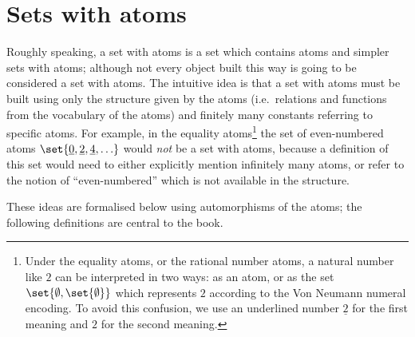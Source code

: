 


\section{Sets with atoms} 
\label{sec:definition-of-sets-with-atoms} Roughly speaking, a set with atoms is a set which contains atoms and simpler sets with atoms; although not every object built this way is going to be considered a set with atoms.
The intuitive idea is that a set with atoms must be built using only the structure given by the atoms (i.e.~relations and functions from the vocabulary of the atoms) and finitely many constants referring to specific atoms. For example, in the equality atoms\footnote{Under the equality atoms, or the rational number atoms, a natural number like $2$ can be interpreted in two ways: as an atom, or as the set $\set{\emptyset, \set{\emptyset}}$ which represents $2$ according to the Von Neumann numeral encoding. To avoid this confusion, we use an underlined number $\underline 2$ for the first meaning and $2$ for the second meaning.} the set of even-numbered atoms $\set{\underline 0, \underline 2, \underline 4, \ldots}$ would \emph{not} be a set with atoms, because a definition of this set would need to either explicitly mention infinitely many atoms, or refer to the notion of ``even-numbered'' which is not available in the structure. 

These ideas are formalised below using automorphisms of the atoms; the following definitions are central to the book.

